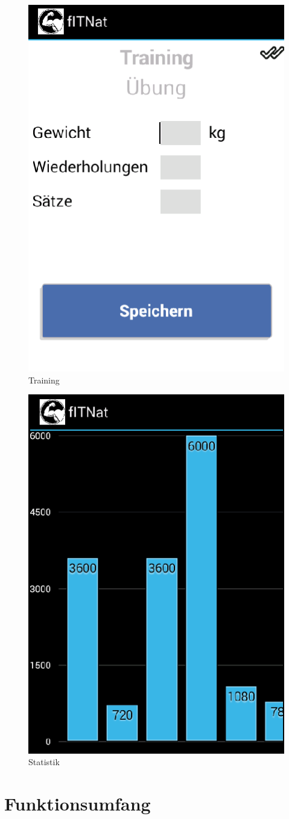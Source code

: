 \begin{figure}[!h]
\centering
\includegraphics[width=0.5\linewidth]{content/images/App/Training}
\caption{Training}
\label{pic:natAppTraining}
\end{figure}
\begin{figure}[!h]
\centering
\includegraphics[width=0.5\linewidth]{content/images/App/Statistik}
\caption{Statistik}
\label{pic:natAppStatistik}
\end{figure}

\section{Funktionsumfang}
\label{natAppFunktionen}